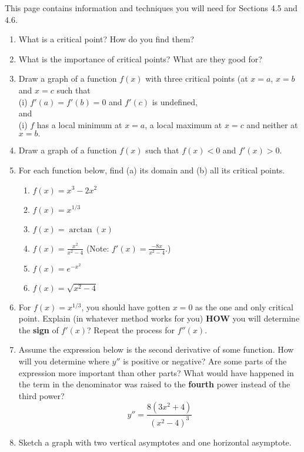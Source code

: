 \documentclass[12pt]{article}
\renewcommand{\emph}[1]{\textsf{\textbf{#1}}}
\begin{document}
\addtolength\itemsep{-1mm}

This page contains information and techniques you will need for Sections 4.5 and 4.6.\\
\begin{enumerate}
\item What is a critical point? How do you find them?
\vspace{.5in}
\item What is the importance of critical points? What are they good for?
\vspace{.5in}
\item Draw a graph of a function $f(x)$ with three critical points (at $x=a$, $x=b$ and $x=c$ such that \\
(i) $f'(a)=f'(b)=0$ and $f'(c)$ is undefined,\\
and\\
(i) $f$ has a local minimum at $x=a$, a local maximum at $x=c$ and neither at $x=b.$
\vfill
\item Draw a graph of a function $f(x)$ such that $f(x)<0$ and $f'(x) >0.$
\vfill
\newpage
\item For each function below, find (a) its domain and (b) all its critical points.
	\begin{enumerate}
	\item $f(x)=x^3-2x^2$
	\vfill
	\item $f(x)=x^{1/3}$
	\vfill
	\item $f(x)=\arctan(x)$
	\vfill
	\item $f(x)=\frac{x^2}{x^2-4}$ (Note: $f'(x)=\frac{-8x}{x^2-4}.$)
	\vfill
	\item $f(x)=e^{-x^2}$
	\vfill
	\item $f(x)=\sqrt{x^2-4}$
	\vfill
	\end{enumerate}
\newpage
\item For $f(x)=x^{1/3}$, you should have gotten $x=0$ as the one and only critical point. Explain (in whatever method works for you) \emph{HOW} you will determine the \emph{sign} of $f'(x)$? Repeat the process for $f''(x).$
\vfill
\item Assume the expression below is the second derivative of some function. How will you determine where $y''$ is positive or negative? Are some parts of the expression more important than other parts? What would have happened in the term in the denominator was raised to the \emph{fourth} power instead of the third power?\\
$$y''=\frac{8(3x^2+4)}{(x^2-4)^3}$$
\vfill
\item Sketch a graph with two vertical asymptotes and one horizontal asymptote.

\end{enumerate}
\end{document}
